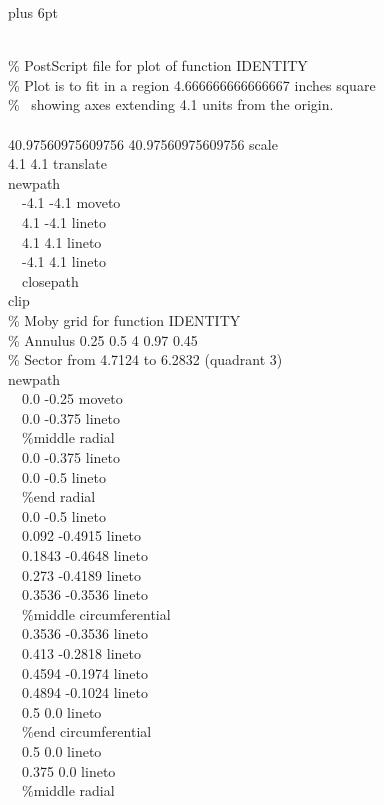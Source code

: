 \begin{new}
\begingroup\small  \topsep 0pt plus 6pt \relax
\begin{lisp}
\\
\% PostScript file for plot of function IDENTITY \\
\% Plot is to fit in a region 4.666666666666667 inches square \\
\% ~showing axes extending 4.1 units from the origin. \\
 \\
40.97560975609756 40.97560975609756 scale \\
4.1 4.1 translate \\
newpath \\
~~-4.1 -4.1 moveto \\
~~4.1 -4.1 lineto \\
~~4.1 4.1 lineto \\
~~-4.1 4.1 lineto \\
~~closepath \\
clip \\
\% Moby grid for function IDENTITY \\
\% Annulus 0.25 0.5 4 0.97 0.45 \\
\% Sector from 4.7124 to 6.2832 (quadrant 3) \\
newpath \\
~~0.0 -0.25 moveto \\
~~0.0 -0.375 lineto \\
~~\%middle radial \\
~~0.0 -0.375 lineto \\
~~0.0 -0.5 lineto \\
~~\%end radial \\
~~0.0 -0.5 lineto \\
~~0.092 -0.4915 lineto \\
~~0.1843 -0.4648 lineto \\
~~0.273 -0.4189 lineto \\
~~0.3536 -0.3536 lineto \\
~~\%middle circumferential \\
~~0.3536 -0.3536 lineto \\
~~0.413 -0.2818 lineto \\
~~0.4594 -0.1974 lineto \\
~~0.4894 -0.1024 lineto \\
~~0.5 0.0 lineto \\
~~\%end circumferential \\
~~0.5 0.0 lineto \\
~~0.375 0.0 lineto \\
~~\%middle radial \\

\end{lisp}
\end{new}
